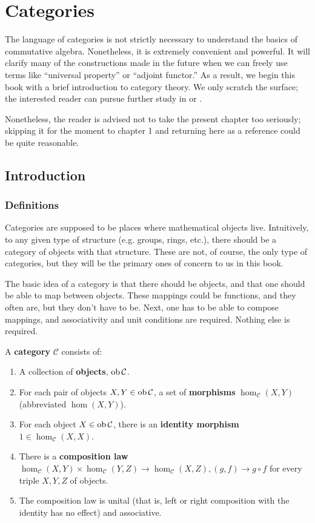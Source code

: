 \setcounter{chapter}{-1}
\chapter{Categories}
\label{categorychapter}


The language of categories is not strictly necessary to understand the basics
of  commutative
algebra. Nonetheless, it is extremely convenient and powerful. It will clarify
many of the constructions made in the future when we can freely use terms like
``universal property'' or ``adjoint functor.'' As a result, we begin this book
with a brief introduction to category theory. We only scratch the surface; the
interested reader can pursue further study in \cite{Ma98} or \cite{KS05}.


Nonetheless, the reader is advised not to take the present chapter too
seriously; skipping it for the moment to chapter 1 and returning here as a
reference could be quite reasonable.

\section{Introduction}

\subsection{Definitions}

Categories are supposed to be places where mathematical objects live.
Intuitively, to any given type of structure (e.g. groups, rings, etc.),
there should be a
category of objects with that structure. These are not, of course, the only
type of categories, but they will be the primary ones of concern to us in this
book.


The basic idea of a category is that there should be objects, and that one
should be able to map between objects. These mappings could be functions, and
they often are, but they don't have to be. Next, one has to be able to compose
mappings, and associativity and unit conditions are required. Nothing else is required.

\begin{definition}
A \textbf{category} $\mathcal{C}$ consists of:
\begin{enumerate}
\item  A collection of \textbf{objects},
$\operatorname{ob} \mathcal{C}$.
\item For each pair of objects $X, Y \in
\operatorname{ob} \mathcal{C}$, a set
of \textbf{morphisms} $\hom_{\mathcal{C}}(X, Y)$ (abbreviated $\hom(X,Y)$).
\item For each object $X \in \operatorname{ob}\mathcal{C}$, there is an \textbf{identity
morphism}
$1 \in \hom_{\mathcal{C}}(X, X)$.
\item There is a \textbf{composition law}
$\hom_{\mathcal{C}}(X, Y) \times \hom_{\mathcal{C}}(Y, Z) \to
\hom_{\mathcal{C}}(X, Z), (g, f) \to g
\circ f$ for every
triple $X, Y, Z$ of objects.
\item  The composition law is unital (that is, left or right composition with
the identity has no effect) and associative.
\end{enumerate}
\end{definition}

